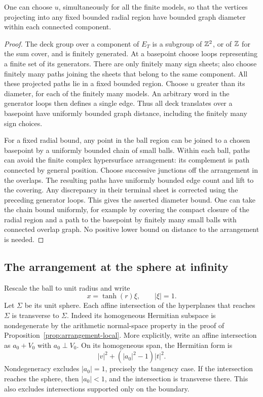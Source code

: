 \begin{lemma}\label{mod:bounded-core}
One can choose $u$, simultaneously for all the finite models, so
that the vertices projecting into any fixed bounded radial region
have bounded graph diameter within each connected component.
\end{lemma}
\begin{proof}
The deck group over a component of $E_T$ is a subgroup of $\mathbb Z^2$,
or of $\mathbb Z$ for the sum cover, and is finitely generated.  At a
basepoint choose loops representing a finite set of its generators.
There are only finitely many sign sheets; also choose finitely
many paths joining the sheets that belong to the same component.
All these projected paths lie in a fixed bounded region.  Choose
$u$ greater than its diameter, for each of the finitely many models.
An arbitrary word in the generator loops then defines a single
edge.  Thus all deck translates over a basepoint have uniformly
bounded graph distance, including the finitely many sign choices.

For a fixed radial bound, any point in the ball region can be
joined to a chosen basepoint by a uniformly bounded chain of small
balls.  Within each ball, paths can avoid the finite complex
hypersurface arrangement: its complement is path connected by
general position.  Choose successive junctions off the arrangement
in the overlaps.  The resulting paths have uniformly bounded
edge count and lift to the covering.  Any discrepancy in their
terminal sheet is corrected using the preceding generator loops.
This gives the asserted diameter bound.  One can take the chain
bound uniformly, for example by covering the compact closure of
the radial region and a path to the basepoint by finitely many
small balls with connected overlap graph.  No positive lower
bound on distance to the arrangement is needed.
\end{proof}

\subsection{The arrangement at the sphere at infinity}

Rescale the ball to unit radius and write
\[
 x=\tanh(r)\xi,\qquad |\xi|=1.
\]
Let $\Sigma$ be its unit sphere.  Each affine intersection of the
hyperplanes that reaches $\Sigma$ is transverse to $\Sigma$.
Indeed its homogeneous Hermitian subspace is nondegenerate by the
arithmetic normal-space property in the proof of
Proposition~\ref{prop:arrangement-local}.  More explicitly, write
an affine intersection as $a_0+V_0$ with $a_0\perp V_0$.  On its
homogeneous span, the Hermitian form is
\[
 |v|^2+(|a_0|^2-1)|t|^2.
\]
Nondegeneracy excludes $|a_0|=1$, precisely the tangency case.
If the intersection reaches the sphere, then $|a_0|<1$, and the
intersection is transverse there.  This also excludes intersections
supported only on the boundary.

